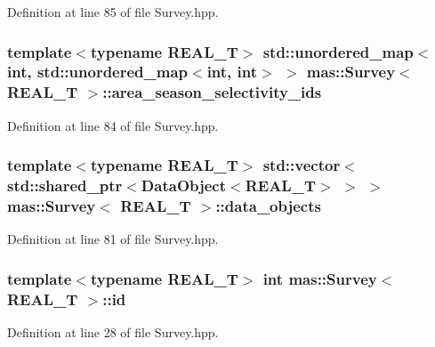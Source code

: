 Definition at line 85 of file Survey.\-hpp.

\hypertarget{structmas_1_1_survey_a0b41369965fde2f49c1511a38a60447a}{
\subsubsection[{area\-\_\-season\-\_\-selectivity\-\_\-ids}]{\setlength{\rightskip}{0pt plus 5cm}template$<$typename R\-E\-A\-L\-\_\-\-T$>$ std\-::unordered\-\_\-map$<$int, std\-::unordered\-\_\-map$<$int, int$>$ $>$ {\bf mas\-::\-Survey}$<$ R\-E\-A\-L\-\_\-\-T $>$\-::area\-\_\-season\-\_\-selectivity\-\_\-ids}}\label{structmas_1_1_survey_a0b41369965fde2f49c1511a38a60447a}


Definition at line 84 of file Survey.\-hpp.

\hypertarget{structmas_1_1_survey_a2dd1a625771db3a41ed2a050a984beeb}{
\subsubsection[{data\-\_\-objects}]{\setlength{\rightskip}{0pt plus 5cm}template$<$typename R\-E\-A\-L\-\_\-\-T$>$ std\-::vector$<$std\-::shared\-\_\-ptr$<${\bf Data\-Object}$<$R\-E\-A\-L\-\_\-\-T$>$ $>$ $>$ {\bf mas\-::\-Survey}$<$ R\-E\-A\-L\-\_\-\-T $>$\-::data\-\_\-objects}}\label{structmas_1_1_survey_a2dd1a625771db3a41ed2a050a984beeb}


Definition at line 81 of file Survey.\-hpp.

\hypertarget{structmas_1_1_survey_a0e0e24656b837749042a9ed368a61aa6}{
\subsubsection[{id}]{\setlength{\rightskip}{0pt plus 5cm}template$<$typename R\-E\-A\-L\-\_\-\-T$>$ int {\bf mas\-::\-Survey}$<$ R\-E\-A\-L\-\_\-\-T $>$\-::id}}\label{structmas_1_1_survey_a0e0e24656b837749042a9ed368a61aa6}


Definition at line 28 of file Survey.\-hpp.

